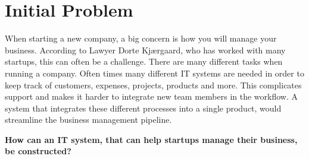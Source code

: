 \section{Initial Problem}
When starting a new company, a big concern is how you will manage your business. 
According to Lawyer Dorte Kjærgaard, who has worked with many startups, this can often be a challenge. There are many different tasks when running a company. Often times many different IT systems are needed in order to keep track of customers, expenses, projects, products and more. This complicates support and makes it harder to integrate new team members in the workflow.
A system that integrates these different processes into a single product, would streamline the business management pipeline. 

\textbf{How can an IT system, that can help startups manage their business, be constructed?}